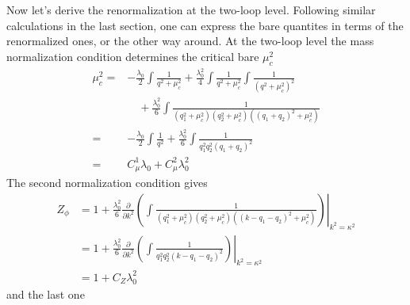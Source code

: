 \documentclass[submission, PhysLectNotes]{SciPost}
\begin{document}
Now let's derive the renormalization at the two-loop level. Following similar calculations in the last section, one can express the bare quantites in terms of the renormalized ones, or the other way around. At the two-loop level the mass normalization condition determines the critical bare $\mu_c^2$  
\begin{equation}
	\begin{aligned}
		\mu_c^2 = &-\frac{\lambda_0}{2} \int \frac{1}{q^2 + \mu_c^2} + \frac{\lambda_0^2}{4} \int \frac{1}{q^2 + \mu_c^2} \int \frac{1}{\left(q^2 + \mu_c^2\right)^2} \\
		& \quad + \frac{\lambda_0^2}{6} \int \frac{1}{\left(q_1^2 + \mu_c^2\right)\left(q_2^2 + \mu_c^2\right)\left(\left(q_1+q_2\right)^2 + \mu_c^2\right)} \\
		= & -\frac{\lambda_0}{2} \int \frac{1}{q^2} + \frac{\lambda_0^2}{6} \int \frac{1}{q_1^2 q_2^2 \left(q_1+q_2\right)^2 } \\
		=& C_\mu^1 \lambda_0 + C_\mu^2 \lambda_0^2 
	\end{aligned}
\end{equation} 
The second normalization condition gives
\begin{equation}
	\begin{aligned}
		Z_\phi &= 1 + \frac{\lambda_0^2}{6} \left.\frac{\partial}{\partial k^2} \left( \int \frac{1}{\left(q_1^2 + \mu_c^2\right)\left(q_2^2 + \mu_c^2\right)\left(\left(k - q_1-q_2\right)^2 + \mu_c^2\right)} \right)
		\right\vert_{k^2=\kappa^2} \\
		& = 1 + \frac{\lambda_0^2}{6} \left.\frac{\partial}{\partial k^2} \left( \int \frac{1}{ q_1^2 q_2^2 \left(k - q_1-q_2\right)^2 } \right)
		\right\vert_{k^2=\kappa^2} \\
		&= 1 + C_Z \lambda_0^2
	\end{aligned}
\end{equation} 
and the last one 
\end{document}
